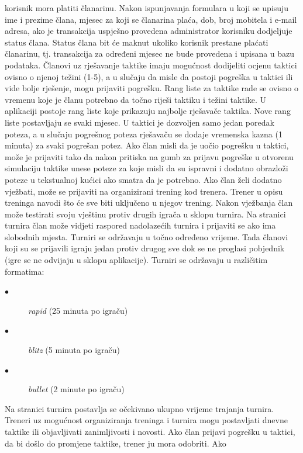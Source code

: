 			korisnik mora platiti članarinu. Nakon ispunjavanja formulara u koji se
			upisuju ime i prezime člana, mjesec za koji se članarina plaća, dob,
			broj mobitela i e-mail adresa, ako je transakcija uspješno provedena
			administrator korisniku dodjeljuje status člana. Status člana bit će
			maknut ukoliko korisnik prestane plaćati članarinu, tj. transakcija za
			određeni mjesec ne bude provedena i upisana u bazu podataka. Članovi uz
			rješavanje taktike imaju mogućnost dodijeliti ocjenu taktici ovisno o
			njenoj težini (1-5), a u slučaju da misle da postoji pogreška u taktici
			ili vide bolje rješenje, mogu prijaviti pogrešku. Rang liste za taktike
			rade se ovisno o vremenu koje je članu potrebno da točno riješi taktiku
			i težini taktike. U aplikaciji postoje rang liste koje prikazuju
			najbolje rješavače taktika. Nove rang liste postavljaju se svaki mjesec.
			U taktici je dozvoljen samo jedan poredak poteza, a u slučaju pogrešnog
			poteza rješavaču se dodaje vremenska kazna (1 minuta) za svaki pogrešan
			potez. Ako član misli da je uočio pogrešku u taktici, može je prijaviti
			tako da nakon pritiska na gumb za prijavu pogreške u otvorenu simulaciju
			taktike unese poteze za koje misli da su ispravni i dodatno obrazloži
			poteze u tekstualnoj kućici ako smatra da je potrebno. Ako član želi
			dodatno vježbati, može se prijaviti na organizirani trening kod trenera.
			Trener u opisu treninga navodi što će sve biti uključeno u njegov
			trening. Nakon vježbanja član može testirati svoju vještinu protiv
			drugih igrača u sklopu turnira. Na stranici turnira član može vidjeti
			raspored nadolazećih turnira i prijaviti se ako ima slobodnih mjesta.
			Turniri se održavaju u točno određeno vrijeme. Tada članovi koji su se
			prijavili igraju jedan protiv drugog sve dok se ne proglasi pobjednik
			(igre se ne odvijaju u sklopu aplikacije). Turniri se održavaju u
			različitim formatima:
			\begin{description} 
			\item[$\bullet$] \textit{rapid} (25 minuta po igraču)
		    \item[$\bullet$] \textit{blitz} (5 minuta po igraču)
			\item[$\bullet$] \textit{bullet} (2 minute po igraču)
		    \end{description}
			 Na stranici turnira postavlja se
			očekivano ukupno vrijeme trajanja turnira. Treneri uz mogućnost
			organiziranja treninga i turnira mogu postavljati dnevne taktike ili
			objavljivati zanimljivosti i novosti. Ako član prijavi pogrešku u
			taktici, da bi došlo do promjene taktike, trener ju mora odobriti. Ako
